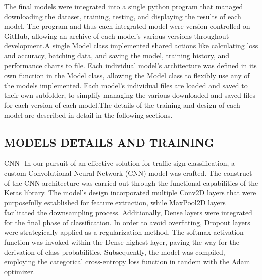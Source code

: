 \documentclass[conference]{IEEEtran}
\begin{document}
The final models were integrated into a single python program that managed downloading the dataset, training, testing, and displaying the results of each model. The program and thus each integrated model were version controlled on GitHub, allowing an archive of each model's various versions throughout development.A single Model class implemented shared actions like calculating loss and accuracy, batching data, and saving the model, training history, and performance charts to file. Each individual model's architecture was defined in its own function in the Model class, allowing the Model class to flexibly use any of the models implemented. Each model's individual files are loaded and saved to their own subfolder, to simplify managing the various downloaded and saved files for each version of each model.The details of the training and design of each model are described in detail in the following sections.

\subsection{MODELS DETAILS AND TRAINING}
CNN -In our pursuit of an effective solution for traffic sign classification, a custom Convolutional Neural Network (CNN) model was crafted. The construct of the CNN architecture was carried out through the functional capabilities of the Keras library. The model's design incorporated multiple Conv2D layers that were purposefully established for feature extraction, while MaxPool2D layers facilitated the downsampling process. Additionally, Dense layers were integrated for the final phase of classification. In order to avoid overfitting, Dropout layers were strategically applied as a regularization method. The softmax activation function was invoked within the Dense highest layer, paving the way for the derivation of class probabilities. Subsequently, the model was compiled, employing the categorical cross-entropy loss function in tandem with the Adam optimizer.
\end{document}
